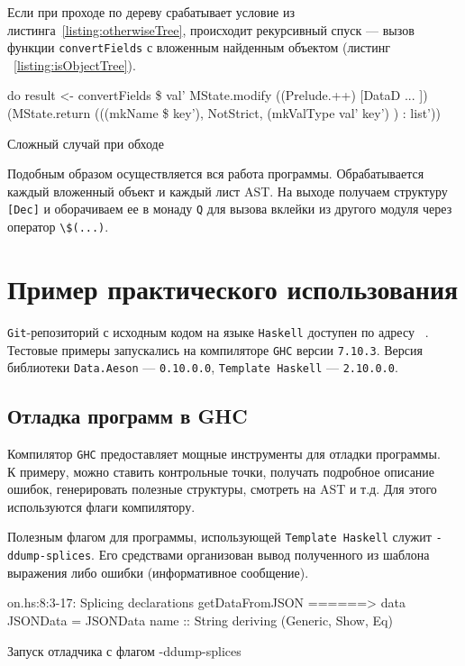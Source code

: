 Если при проходе по дереву срабатывает условие из листинга~\ref{listing:otherwiseTree}, происходит рекурсивный спуск --- вызов функции \lstinline{convertFields} с вложенным найденным объектом (листинг ~\ref{listing:isObjectTree}).

\begin{ListingEnv}[H]
\begin{Verb}
do
      result <- convertFields \$ val'
      MState.modify ((Prelude.++) [DataD ... ])
      (MState.return (((mkName \$  key'), NotStrict,
                                (mkValType val' key') ) : list'))
\end{Verb}
\caption{Сложный случай при обходе}
\label{listing:isObjectTree}
\end{ListingEnv} 

Подобным образом осуществляется вся работа программы. Обрабатывается каждый вложенный объект и каждый лист AST. На выходе получаем структуру \lstinline{[Dec]} и оборачиваем ее в монаду \lstinline{Q} для вызова вклейки из другого модуля через оператор \lstinline{\$(...)}.

\chapter{Пример практического использования}

\lstinline{Git}-репозиторий с исходным кодом на языке \lstinline{Haskell} доступен по адресу ~\cite{diploma}. Тестовые примеры запускались на компиляторе \lstinline{GHC} версии \lstinline{7.10.3}. Версия библиотеки \lstinline{Data.Aeson} --- \lstinline{0.10.0.0}, \lstinline{Template Haskell} --- \lstinline{2.10.0.0}.

\section{Отладка программ в GHC}

Компилятор \lstinline{GHC} предоставляет мощные инструменты для отладки программы. ~\cite{debugGHC} К примеру, можно ставить контрольные точки, получать подробное описание ошибок, генерировать полезные структуры, смотреть на AST и т.д. Для этого используются флаги компилятору. 

Полезным флагом для программы, использующей \lstinline{Template Haskell} служит \lstinline{-ddump-splices}. Его средствами организован вывод полученного из шаблона выражения либо ошибки (информативное сообщение).

\begin{ListingEnv}[H]
\begin{Verb}
on.hs:8:3-17: Splicing declarations
    getDataFromJSON
  ======>
    data JSONData
      = JSONData {name :: String}
      deriving (Generic, Show, Eq)
\end{Verb}
\caption{Запуск отладчика с флагом -ddump-splices}
\end{ListingEnv}

